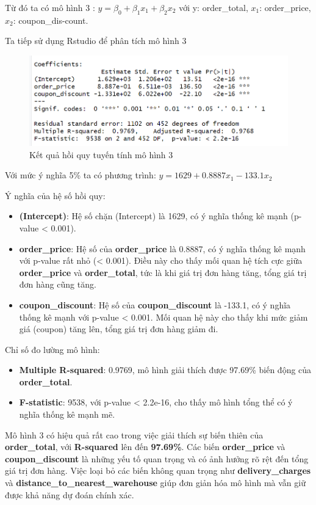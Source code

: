 Từ đó ta có mô hình 3 : $y= \beta_0 + \beta_1x_1 + \beta_2x_2$ với y: order\_total, $x_1$: order\_price, $x_2$: coupon\_dis-count.

Ta tiếp sử dụng Rstudio để phân tích mô hình 3
\begin{figure}[H]
  \centering
  \includegraphics[width=0.7\linewidth]{graphics/5.5.4.png}
  \caption{Kết quả hồi quy tuyến tính mô hình 3 }
\end{figure}

Với mức ý nghĩa 5\% ta có phương trình: $y= 1629 + 0.8887x_1 - 133.1 x_2$

Ý nghĩa của hệ số hồi quy:
\begin{itemize}
\item\textbf{(Intercept)}: Hệ số chặn (Intercept) là 1629, có ý nghĩa thống kê mạnh (p-value < 0.001).
\item\textbf{order\_price}: Hệ số của \textbf{order\_price} là 0.8887, có ý nghĩa thống kê mạnh với p-value rất nhỏ (< 0.001). Điều này cho thấy mối quan hệ tích cực giữa \textbf{order\_price} và \textbf{order\_total}, tức là khi giá trị đơn hàng tăng, tổng giá trị đơn hàng cũng tăng.
\item\textbf{coupon\_discount}: Hệ số của \textbf{coupon\_discount} là -133.1, có ý nghĩa thống kê mạnh với p-value < 0.001. Mối quan hệ này cho thấy khi mức giảm giá (coupon) tăng lên, tổng giá trị đơn hàng giảm đi.
\end{itemize}

Chỉ số đo lường mô hình:

\begin{itemize}
\item\textbf{Multiple R-squared}: 0.9769, mô hình giải thích được 97.69\% biến động của \textbf{order\_total}.
\item\textbf{F-statistic}: 9538, với p-value < 2.2e-16, cho thấy mô hình tổng thể có ý nghĩa thống kê mạnh mẽ.
\end{itemize}

Mô hình 3 có hiệu quả rất cao trong việc giải thích sự biến thiên của \textbf{order\_total}, với \textbf{R-squared} lên đến \textbf{97.69\%}. Các biến \textbf{order\_price} và \textbf{coupon\_discount} là những yếu tố quan trọng và có ảnh hưởng rõ rệt đến tổng giá trị đơn hàng. Việc loại bỏ các biến không quan trọng như \textbf{delivery\_charges} và \textbf{distance\_to\_nearest\_warehouse} giúp đơn giản hóa mô hình mà vẫn giữ được khả năng dự đoán chính xác.

